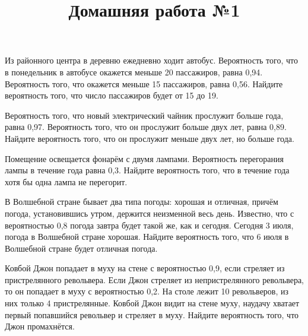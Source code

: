 \begin{listofex}
	\item Из районного центра в деревню ежедневно ходит автобус. Вероятность того, что в понедельник в автобусе окажется меньше 20 пассажиров, равна 0,94. Вероятность того, что окажется меньше 15 пассажиров, равна 0,56. Найдите вероятность того, что число пассажиров будет от 15 до 19.
	\item Вероятность того, что новый электрический чайник прослужит больше года, равна 0,97. Вероятность того, что он прослужит больше двух лет, равна 0,89. Найдите вероятность того, что он прослужит меньше двух лет, но больше года.
	\item Помещение освещается фонарём с двумя лампами. Вероятность перегорания лампы в течение года равна 0,3. Найдите вероятность того, что в течение года хотя бы одна лампа не перегорит.
	\item В Волшебной стране бывает два типа погоды: хорошая и отличная, причём погода, установившись утром, держится неизменной весь день. Известно, что с вероятностью 0,8 погода завтра будет такой же, как и сегодня. Сегодня 3 июля, погода в Волшебной стране хорошая. Найдите вероятность того, что 6 июля в Волшебной стране будет отличная погода.
	\item Ковбой Джон попадает в муху на стене с вероятностью 0,9, если стреляет из пристрелянного револьвера. Если Джон стреляет из непристрелянного револьвера, то он попадает в муху с вероятностью 0,2. На столе лежит 10 револьверов, из них только 4 пристрелянные. Ковбой Джон видит на стене муху, наудачу хватает первый попавшийся револьвер и стреляет в муху. Найдите вероятность того, что Джон промахнётся.
\end{listofex}
\newpage
\title{Домашняя работа №1}
